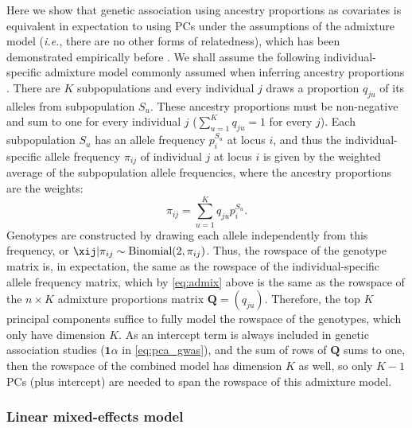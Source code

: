 \documentclass[11pt]{article}
\begin{document}
Here we show that genetic association using ancestry proportions as covariates is equivalent in expectation to using PCs under the assumptions of the admixture model (\textit{i.e.}, there are no other forms of relatedness), which has been demonstrated empirically before \citep{alexander_fast_2009, zhou_strong_2016}.
We shall assume the following individual-specific admixture model commonly assumed when inferring ancestry proportions \citep{pritchard_inference_2000, falush_inference_2003, alexander_fast_2009, gopalan_scaling_2016, cabreros_likelihood-free_2019}.
There are $K$ subpopulations and every individual $j$ draws a proportion $q_{ju}$ of its alleles from subpopulation $S_u$.
These ancestry proportions must be non-negative and sum to one for every individual $j$ ($\sum_{u=1}^K q_{ju} = 1$ for every $j$).
Each subpopulation $S_u$ has an allele frequency $p_i^{S_u}$ at locus $i$, and thus the individual-specific allele frequency $\pi_{ij}$ of individual $j$ at locus $i$ is given by the weighted average of the subpopulation allele frequencies, where the ancestry proportions are the weights:
\begin{equation}
  \label{eq:admix}
  \pi_{ij} = \sum_{u=1}^K q_{ju} p_i^{S_u}.
\end{equation}
Genotypes are constructed by drawing each allele independently from this frequency, or $\xij | \pi_{ij} \sim \text{Binomial}(2, \pi_{ij})$.
Thus, the rowspace of the genotype matrix is, in expectation, the same as the rowspace of the individual-specific allele frequency matrix, which by \cref{eq:admix} above is the same as the rowspace of the $n \times K$ admixture proportions matrix $\mathbf{Q} = (q_{ju})$.
Therefore, the top $K$ principal components suffice to fully model the rowspace of the genotypes, which only have dimension $K$.
As an intercept term is always included in genetic association studies ($\mathbf{1} \alpha$ in \cref{eq:pca_gwas}), and the sum of rows of $\mathbf{Q}$ sums to one, then the rowspace of the combined model has dimension $K$ as well, so only $K-1$ PCs (plus intercept) are needed to span the rowspace of this admixture model.

\subsubsection{Linear mixed-effects model}
\end{document}
